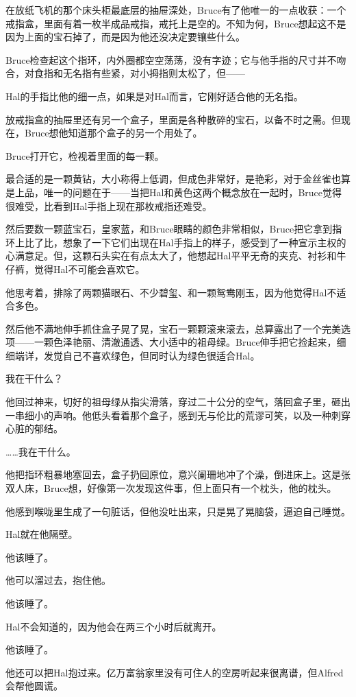 \documentclass[../main.tex]{subfiles}
\begin{document}
在放纸飞机的那个床头柜最底层的抽屉深处，Bruce有了他唯一的一点收获：一个戒指盒，里面有着一枚半成品戒指，戒托上是空的。不知为何，Bruce想起这不是因为上面的宝石掉了，而是因为他还没决定要镶些什么。

Bruce检查起这个指环，内外圈都空空荡荡，没有字迹；它与他手指的尺寸并不吻合，对食指和无名指有些紧，对小拇指则太松了，但——

Hal的手指比他的细一点，如果是对Hal而言，它刚好适合他的无名指。

放戒指盒的抽屉里还有另一个盒子，里面是各种散碎的宝石，以备不时之需。但现在，Bruce想他知道那个盒子的另一个用处了。

Bruce打开它，检视着里面的每一颗。

最合适的是一颗黄钻，大小称得上低调，但成色非常好，是艳彩，对于金丝雀也算是上品，唯一的问题在于——当把Hal和黄色这两个概念放在一起时，Bruce觉得很难受，比看到Hal手指上现在那枚戒指还难受。

然后要数一颗蓝宝石，皇家蓝，和Bruce眼睛的颜色非常相似，Bruce把它拿到指环上比了比，想象了一下它们出现在Hal手指上的样子，感受到了一种宣示主权的心满意足。但，这颗石头实在有点太大了，他想起Hal平平无奇的夹克、衬衫和牛仔裤，觉得Hal不可能会喜欢它。

他思考着，排除了两颗猫眼石、不少碧玺、和一颗鸳鸯刚玉，因为他觉得Hal不适合多色。

然后他不满地伸手抓住盒子晃了晃，宝石一颗颗滚来滚去，总算露出了一个完美选项——一颗色泽艳丽、清澈通透、大小适中的祖母绿。Bruce伸手把它捡起来，细细端详，发觉自己不喜欢绿色，但同时认为绿色很适合Hal。

我在干什么？

他回过神来，切好的祖母绿从指尖滑落，穿过二十公分的空气，落回盒子里，砸出一串细小的声响。他低头看着那个盒子，感到无与伦比的荒谬可笑，以及一种刺穿心脏的郁结。

\ldots\ldots 我在干什么。

他把指环粗暴地塞回去，盒子扔回原位，意兴阑珊地冲了个澡，倒进床上。这是张双人床，Bruce想，好像第一次发现这件事，但上面只有一个枕头，他的枕头。

他感到喉咙里生成了一句脏话，但他没吐出来，只是晃了晃脑袋，逼迫自己睡觉。

Hal就在他隔壁。

他该睡了。

他可以溜过去，抱住他。

他该睡了。

Hal不会知道的，因为他会在两三个小时后就离开。

他该睡了。

他还可以把Hal抱过来。亿万富翁家里没有可住人的空房听起来很离谱，但Alfred会帮他圆谎。
\end{document}
